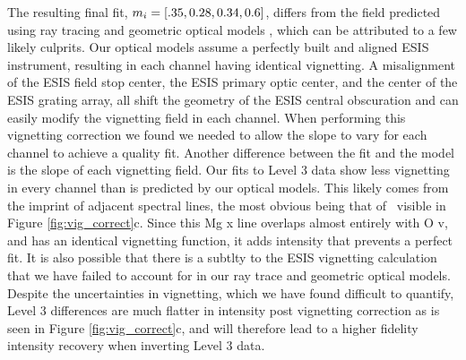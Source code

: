 The resulting final fit, $m_i = [.35, 0.28, 0.34, 0.6]$, differs from the field predicted using ray tracing and geometric optical models \citep{ESIS}, which can be attributed to a few likely culprits. 
Our optical models assume a perfectly built and aligned ESIS instrument, resulting in each channel having identical vignetting.
A misalignment of the ESIS field stop center, the ESIS primary optic center, and the center of the ESIS grating array, all shift the geometry of the ESIS central obscuration and can easily modify the vignetting field in each channel.
When performing this vignetting correction we found we needed to allow the slope to vary for each channel to achieve a quality fit.
Another difference between the fit and the model is the slope of each vignetting field.
Our fits to Level 3 data show less vignetting in every channel than is predicted by our optical models. 
This likely comes from the imprint of adjacent spectral lines, the most obvious being that of \mgxdim \ visible in Figure \ref{fig:vig_correct}c.
Since this Mg {\sc x} line overlaps almost entirely with O {\sc v}, and has an identical vignetting function, it adds intensity that prevents a perfect fit. 
It is also possible that there is a subtlty to the ESIS vignetting calculation that we have failed to account for in our ray trace and geometric optical models.
Despite the uncertainties in vignetting, which we have found difficult to quantify, Level 3 differences are much flatter in intensity post vignetting correction as is seen in Figure \ref{fig:vig_correct}c, and will therefore lead to a higher fidelity intensity recovery when inverting Level 3 data.

